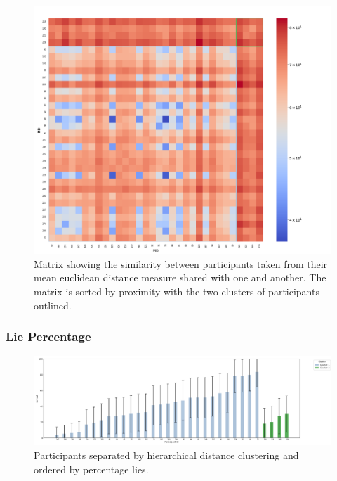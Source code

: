 \documentclass[man, floatsintext]{apa7}
\begin{document}
\begin{figure}[H]
	\includegraphics[width=\linewidth]{../plots/PID/DistanceMatrix.png}
	\caption{Matrix showing the similarity between participants taken from their mean euclidean distance measure shared with one and another. The matrix is sorted by proximity with the two clusters of participants outlined.}
	\label{fig:DistanceMatrix}
\end{figure}

\subsubsection{Lie Percentage}

\begin{figure}[H]
	\includegraphics[width=\linewidth]{../plots/PID/PercentLiesByPID.png}
	\caption{Participants separated by hierarchical distance clustering and ordered by percentage lies.}
	\label{fig:PercentLiesByPIDCluster}
\end{figure}
\end{document}
